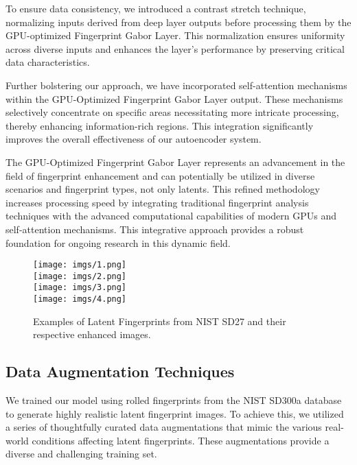 \documentclass[twocolumn, switch]{article} %
\begin{document}
To ensure data consistency, we introduced a contrast stretch technique, normalizing inputs derived from deep layer outputs before processing them by the GPU-optimized Fingerprint Gabor Layer. This normalization ensures uniformity across diverse inputs and enhances the layer's performance by preserving critical data characteristics.

Further bolstering our approach, we have incorporated self-attention mechanisms within the GPU-Optimized Fingerprint Gabor Layer output. These mechanisms selectively concentrate on specific areas necessitating more intricate processing, thereby enhancing information-rich regions. This integration significantly improves the overall effectiveness of our autoencoder system.

The GPU-Optimized Fingerprint Gabor Layer represents an advancement in the field of fingerprint enhancement and can potentially be utilized in diverse scenarios and fingerprint types, not only latents. This refined methodology increases processing speed by integrating traditional fingerprint analysis techniques with the advanced computational capabilities of modern GPUs and self-attention mechanisms. This integrative approach provides a robust foundation for ongoing research in this dynamic field.

\begin{figure*}[htb]
   \centering
     \texttt{[image: imgs/1.png]}\\
     \texttt{[image: imgs/2.png]}\\
     \texttt{[image: imgs/3.png]}\\
     \texttt{[image: imgs/4.png]}
    \caption{Examples of Latent Fingerprints from NIST SD27 \cite{garris2000nist} and their respective enhanced images.}
    \label{examples}
    \vspace{-0.3cm}
\end{figure*}


\vspace{-0.25cm}
\subsection{Data Augmentation Techniques}

We trained our model using rolled fingerprints from the NIST SD300a database to generate highly realistic latent fingerprint images. To achieve this, we utilized a series of thoughtfully curated data augmentations that mimic the various real-world conditions affecting latent fingerprints. These augmentations provide a diverse and challenging training set.
\end{document}
